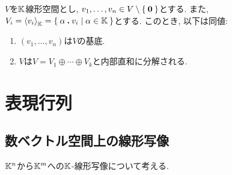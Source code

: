 \begin{prop}
  $V$を$\mathbb{K}$線形空間とし,
  $v_1,\ldots, v_n\in V\setminus\Set{\boldsymbol{0}}$とする.
  また,
  $V_i=\Braket{v_i}_{\mathbb{K}}=\Set{\alpha \mathbin{\boldsymbol{.}}v_i|\alpha \in\mathbb{K}}$とする.
  このとき, 以下は同値:
  \begin{enumerate}
  \item $(v_1,\ldots, v_n)$は$V$の基底.
  \item $V$は$V=V_1\oplus\cdots \oplus V_k$と内部直和に分解される.
  \end{enumerate}
\end{prop}

\begin{quiz}
\end{quiz}




\chapter{表現行列}
\label{chap:repmat}
\section{数ベクトル空間上の線形写像}
$\mathbb{K}^n$から$\mathbb{K}^m$への$\mathbb{K}$-線形写像について考える.

